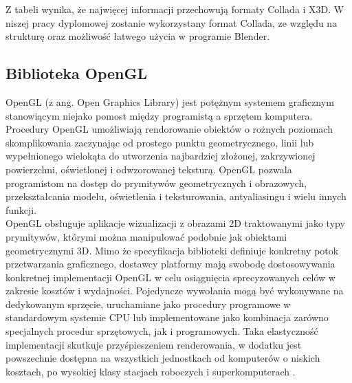 Z tabeli wynika, że najwięcej informacji przechowują formaty Collada i X3D. W niszej pracy dyplomowej zostanie wykorzystany format Collada, ze względu na strukturę oraz możliwość łatwego użycia w programie Blender.

\newpage
\subsection{Biblioteka OpenGL}
OpenGL (z ang. Open Graphics Library) jest potężnym systemem graficznym stanowiącym niejako pomost między programistą a sprzętem komputera. Procedury OpenGL umożliwiają rendorowanie obiektów o rożnych poziomach skomplikowania zaczynając od prostego punktu geometrycznego, linii lub wypełnionego wielokąta do utworzenia najbardziej złożonej, zakrzywionej powierzchni, oświetlonej i odwzorowanej teksturą. OpenGL pozwala programistom na dostęp do prymitywów geometrycznych i obrazowych, przekształcania modelu, oświetlenia i teksturowania, antyaliasingu i wielu innych funkcji. \\
OpenGL obsługuje aplikacje wizualizacji z obrazami 2D traktowanymi jako typy prymitywów, którymi można manipulować podobnie jak obiektami geometrycznymi 3D. Mimo że specyfikacja biblioteki definiuje konkretny potok przetwarzania graficznego, dostawcy platformy mają swobodę dostosowywania konkretnej implementacji OpenGL w celu osiągnięcia sprecyzowanych celów w zakresie kosztów i wydajności. Pojedyncze wywołania mogą być wykonywane na dedykowanym sprzęcie, uruchamiane jako procedury programowe w standardowym systemie CPU lub implementowane jako kombinacja zarówno specjalnych procedur sprzętowych, jak i programowych. Taka elastyczność implementacji skutkuje przyśpieszeniem renderowania, w dodatku jest powszechnie dostępna na wszystkich jednostkach od komputerów o niskich kosztach, po wysokiej klasy stacjach roboczych i superkomputerach \cite{openglofficial}.
